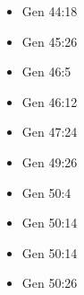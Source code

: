 \documentclass[14pt]{book}
\begin{document}
\begin{multicols}{2}
\begin{itemize}
\item Gen 44:18

\item Gen 45:26

\item Gen 46:5

\item Gen 46:12

\item Gen 47:24

\item Gen 49:26

\item Gen 50:4

\item Gen 50:14

\item Gen 50:14

\item Gen 50:26
\end{itemize}\end{multicols}
\end{document}
